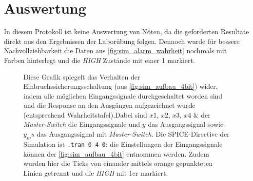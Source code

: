 \documentclass[12pt,english,ngerman]{scrartcl}
\begin{document}
\section{Auswertung}\label{sec:Auswertung}
In diesem Protokoll ist keine Auswertung von Nöten, da die geforderten Resultate
direkt aus den Ergebnissen der Laborübung folgen. Dennoch wurde für bessere 
Nachvollziehbarkeit die Daten aus \autoref{fig:sim_alarm_wahrheit} nochmals mit Farben
hinterlegt und die \textit{HIGH} Zustände mit einer 1 markiert. 

\begin{figure}[H]
  \centering
  \caption{Diese Grafik spiegelt das Verhalten der
    Einbruchssicherungsschaltung (aus \autoref{fig:sim_aufbau_4bit}) wider, indem alle
    möglichen Eingangssignale durchgeschaltet worden sind und die Response an den
    Ausgängen aufgezeichnet wurde (entsprechend Wahrheitstafel).Dabei sind $x1$, $x2$, $x3$, $x4$ \&
    der \textit{Master-Switch} die Eingangssignale und $y$ das Ausgangssignal sowie $y_ms$
    das Ausgangssignal mit \textit{Master-Switch}. Die
    SPICE-Directive der Simulation ist \texttt{.tran 0 4 0}; die
    Einstellungen der Eingangssignale können der \autoref{fig:sim_aufbau_4bit}
  entnommen werden. Zudem wurden hier die Ticks von einander mittels orange gepunkteten Linien getrennt und die \textit{HIGH} mit 1er markiert.}
  \label{fig:sim_alarm_wahrheit_aus}
\end{figure}
\end{document}
